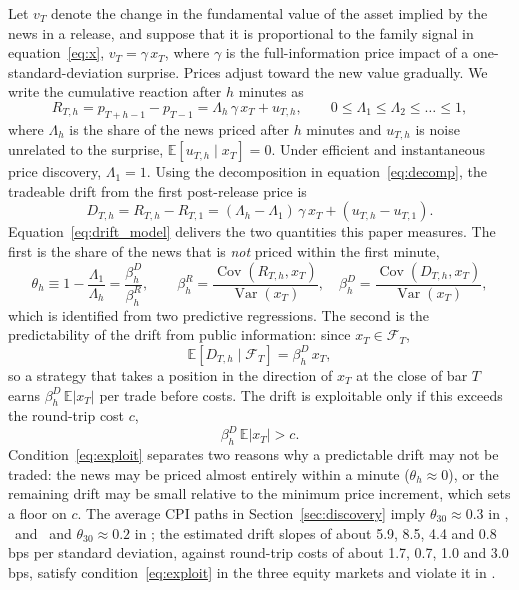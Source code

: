 Let $v_T$ denote the change in the fundamental value of the asset implied by the news in a
release, and suppose that it is proportional to the family signal in equation~\eqref{eq:x},
$v_T=\gamma\,x_T$, where $\gamma$ is the full-information price impact of a one-standard-deviation
surprise. Prices adjust toward the new value gradually. We write the cumulative reaction after
$h$ minutes as
\begin{equation}\label{eq:pa}
  R_{T,h} = p_{T+h-1}-p_{T-1} = \Lambda_h\,\gamma\,x_T + u_{T,h},
  \qquad 0\le \Lambda_1 \le \Lambda_2 \le \dots \le 1,
\end{equation}
where $\Lambda_h$ is the share of the news priced after $h$ minutes and $u_{T,h}$ is noise
unrelated to the surprise, $\mathbb{E}[u_{T,h}\mid x_T]=0$. Under efficient and instantaneous
price discovery, $\Lambda_1=1$. Using the decomposition in equation~\eqref{eq:decomp}, the
tradeable drift from the first post-release price is
\begin{equation}\label{eq:drift_model}
  D_{T,h} = R_{T,h}-R_{T,1} = (\Lambda_h-\Lambda_1)\,\gamma\,x_T + (u_{T,h}-u_{T,1}).
\end{equation}
Equation~\eqref{eq:drift_model} delivers the two quantities this paper measures. The first is the
share of the news that is \emph{not} priced within the first minute,
\begin{equation}\label{eq:theta}
  \theta_h \equiv 1-\frac{\Lambda_1}{\Lambda_h}
  = \frac{\beta^{D}_h}{\beta^{R}_h},
  \qquad
  \beta^{R}_h=\frac{\operatorname{Cov}(R_{T,h},x_T)}{\operatorname{Var}(x_T)},\quad
  \beta^{D}_h=\frac{\operatorname{Cov}(D_{T,h},x_T)}{\operatorname{Var}(x_T)},
\end{equation}
which is identified from two predictive regressions. The second is the predictability of the
drift from public information: since $x_T\in\mathcal{F}_T$,
\begin{equation}\label{eq:predict}
  \mathbb{E}\left[D_{T,h}\mid\mathcal{F}_T\right] = \beta^{D}_h\,x_T,
\end{equation}
so a strategy that takes a position in the direction of $x_T$ at the close of bar $T$ earns
$\beta^{D}_h\,\mathbb{E}|x_T|$ per trade before costs. The drift is exploitable only if this
exceeds the round-trip cost $c$,
\begin{equation}\label{eq:exploit}
  \beta^{D}_h\,\mathbb{E}\left|x_T\right| > c .
\end{equation}
Condition~\eqref{eq:exploit} separates two reasons why a predictable drift may not be traded: the
news may be priced almost entirely within a minute ($\theta_h\approx 0$), or the remaining drift
may be small relative to the minimum price increment, which sets a floor on $c$. The average CPI
paths in Section~\ref{sec:discovery} imply $\theta_{30}\approx 0.3$ in \ES, \NQ\ and \YM\ and
$\theta_{30}\approx 0.2$ in \ZN; the estimated drift slopes of about 5.9, 8.5, 4.4 and 0.8 bps per
standard deviation, against round-trip costs of about 1.7, 0.7, 1.0 and 3.0 bps, satisfy
condition~\eqref{eq:exploit} in the three equity markets and violate it in \ZN.

